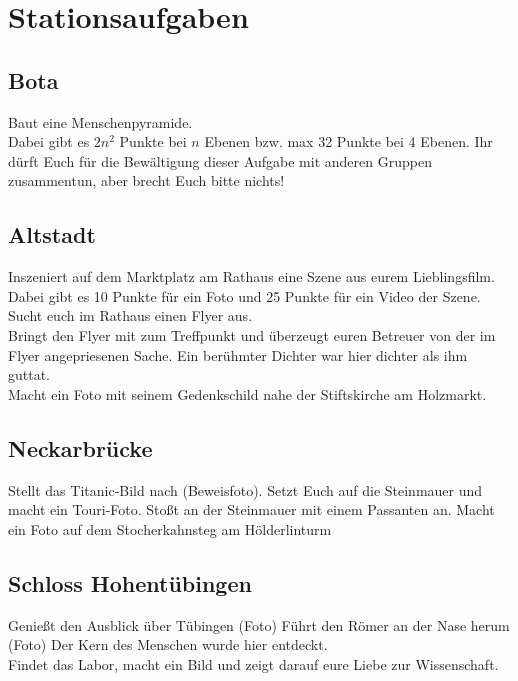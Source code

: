 \documentclass[11pt,paper=a4,answers]{exam}
\renewenvironment{questions}{
	\begin{q}
		\pointsinrightmargin
		\marginpointname{\ Pkt}
		\bracketedpoints }{
	\end{q}}
\begin{document}
\section*{Stationsaufgaben}
\subsection*{Bota}
\begin{questions}
\question[2-32] Baut eine Menschenpyramide. \\
Dabei gibt es $2n^2$ Punkte bei $n$ Ebenen bzw. max 32 Punkte bei 4 Ebenen. Ihr dürft Euch für die Bewältigung dieser Aufgabe mit anderen Gruppen zusammentun, aber brecht Euch bitte nichts!

\end{questions}

\subsection*{Altstadt}
\begin{questions}
\question[10-25] Inszeniert auf dem Marktplatz am Rathaus eine Szene aus eurem Lieblingsfilm. \\
Dabei gibt es 10 Punkte für ein Foto und 25 Punkte für ein Video der Szene.
\question[10] Sucht euch im Rathaus einen Flyer aus. \\
Bringt den Flyer mit zum Treffpunkt und überzeugt euren Betreuer von der im Flyer angepriesenen Sache.
\question[10] Ein berühmter Dichter war hier dichter als ihm guttat. \\
Macht ein Foto mit seinem Gedenkschild nahe der Stiftskirche am Holzmarkt.

\end{questions}

\subsection*{Neckarbrücke}
\begin{questions}
	\question[10] Stellt das Titanic-Bild nach (Beweisfoto).
	\question[10] Setzt Euch auf die Steinmauer und macht ein Touri-Foto. 
	\question[5] Stoßt an der Steinmauer mit einem Passanten an.
	 Macht ein Foto auf dem Stocherkahnsteg am Hölderlinturm

\end{questions}

\subsection*{Schloss Hohentübingen}
\begin{questions}
	\question[10] Genießt den Ausblick über Tübingen (Foto)
	\question[10] Führt den Römer an der Nase herum (Foto)
	\question[10] Der Kern des Menschen wurde hier entdeckt.\\
Findet das Labor, macht ein Bild und zeigt darauf eure Liebe zur Wissenschaft.

\end{questions}
\end{document}
